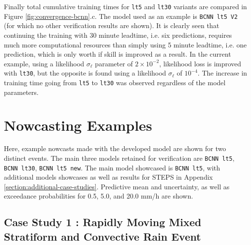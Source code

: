 Finally total cumulative training times for \texttt{lt5} and \texttt{lt30} variants are compared in Figure \ref{fig:convergence-bcnn}.c. The  model used as an example is \texttt{BCNN lt5 V2} (for which no other verification results are shown). It is clearly seen that continuing the training with 30 minute leadtime, i.e. six predictions, requires much more computational resources than simply using 5 minute leadtime, i.e. one prediction, which is only worth if skill is improved as a result. In the current example, using a likelihood $\sigma_\ell$ parameter of $2 \times 10^{-2}$, likelihood loss is improved with \texttt{lt30}, but the opposite is found using a likelihood $\sigma_\ell$ of $10^{-4}$. The increase in training time going from \texttt{lt5} to \texttt{lt30} was observed regardless of the model parameters.

\section{Nowcasting Examples}

Here, example nowcasts made with the developed model are shown for two distinct events. The main three models retained for verification are \texttt{BCNN lt5}, \texttt{BCNN lt30}, \texttt{BCNN lt5 new}. The main model showcased is \texttt{BCNN lt5}, with additional models showcases as well as results for STEPS in Appendix \ref{section:additional-case-studies}.  Predictive mean and uncertainty, as well as exceedance probabilities for 0.5, 5.0, and 20.0 mm/h are shown.  

\subsection{Case Study 1 : Rapidly Moving Mixed Stratiform and Convective Rain Event}

